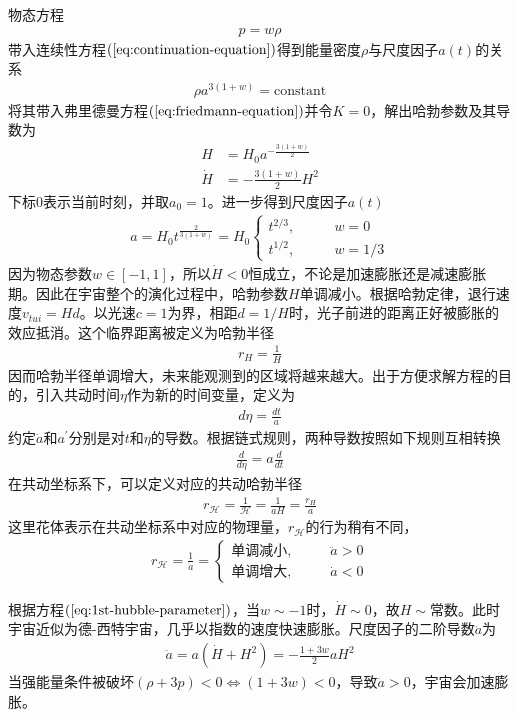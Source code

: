 \documentclass{article}
\begin{document}
物态方程
\begin{align}
  \label{eq:state-equation}
  p=w\rho  
\end{align}
带入连续性方程$(\ref{eq:continuation-equation})$得到能量密度$\rho$与尺度因子$a(t)$的关系
\begin{align}
  \rho a^{3{\left(1+w\right)}}=\text{constant}
\end{align}
将其带入弗里德曼方程$(\ref{eq:friedmann-equation})$并令$K=0$，解出哈勃参数及其导数为
\begin{align}
  \label{eq:hubble-parameter}
  H &=H_0 a^{-\frac{3(1+w)}{2}}\\
  \label{eq:1st-hubble-parameter}
  \dot{H} &= -\frac{3(1+w)}{2}H^2
\end{align}
下标$0$表示当前时刻，并取$a_0=1$。进一步得到尺度因子$a(t)$
\begin{align}
  \label{eq:scale-factor}
  a = H_0 t^{\frac{2}{3(1+w)}} = H_0
  \begin{cases}
    t^{2 /3},\qquad & w=0 \\
    t^{1 /2},\qquad & w=1 /3
  \end{cases}
\end{align}
因为物态参数$w\in [-1,
1]$，所以$\dot{H}<0$恒成立，不论是加速膨胀还是减速膨胀期。因此在宇宙整个的演化过程中，哈勃参数$H$单调减小。根据哈勃定律，退行速度$v_{tui}=Hd$。以光速$c=1$为界，相距$d=1
/H$时，光子前进的距离正好被膨胀的效应抵消。这个临界距离被定义为哈勃半径
\begin{align}
  \label{eq:hubble-distance}
  r_{H}=\frac{1}{H}
\end{align}
因而哈勃半径单调增大，未来能观测到的区域将越来越大。出于方便求解方程的目的，引入共动时间$\eta$作为新的时间变量，定义为
\begin{align}
  \label{eq:conformal-time}
  d\eta = \frac{dt}{a}
\end{align}
约定$\dot{a}$和$a^\prime$分别是对$t$和$\eta$的导数。根据链式规则，两种导数按照如下规则互相转换
\begin{align}
  \label{eq:t-to-eta}
  \frac{d}{d\eta}=a \frac{d}{dt}
\end{align}
在共动坐标系下，可以定义对应的共动哈勃半径
\begin{align}
  \label{eq:comoving-hubble-distance}
  r_{\mathcal{H}} = \frac{1}{\mathcal{H}} = \frac{1}{aH} = \frac{r_{H}}{a}
\end{align}
这里花体表示在共动坐标系中对应的物理量，$r_{\mathcal{H}}$的行为稍有不同，
\begin{align}
  r_{\mathcal{H}} = \frac{1}{\dot{a}} =
  \begin{cases}
    \text{单调减小},\qquad & \ddot{a}>0 \\
    \text{单调增大},\qquad &\dot{a} < 0
  \end{cases}
\end{align}

根据方程$(\ref{eq:1st-hubble-parameter})$，当$w\sim -1$时，$\dot{H}\sim
0$，故$H\sim
\text{常数}$。此时宇宙近似为德-西特宇宙，几乎以指数的速度快速膨胀。尺度因子的二阶导数$\ddot{a}$为
\begin{align}
  \label{eq:2nd-scale-factor}
  \ddot{a}=a{\left(\dot{H}+H^2\right)}=-\frac{1+3w}{2}aH^2
\end{align}
当强能量条件被破坏${\left(\rho+3p\right)}<0\Leftrightarrow
{\left(1+3w\right)}<0$，导致$\ddot{a}>0$，宇宙会加速膨胀。
\end{document}
